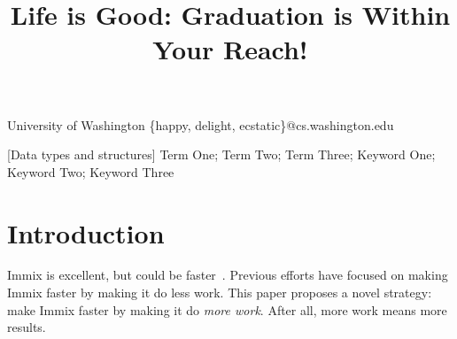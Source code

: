 \documentclass[10pt,natbib,preprint]{sigplanconf}
\begin{document}

\title{Life is Good: Graduation is Within Your Reach!}

           {University of Washington}
           {\{happy, delight, ecstatic\}@cs.washington.edu}

\maketitle



{\footnotesize
{}[Data
    types and structures]
\terms  %
Term One; Term Two; Term Three;
\keywords
Keyword One; Keyword Two; Keyword Three
}


\section{Introduction}

Immix is excellent, but could be faster~\citep{immix}. Previous efforts have
focused on making Immix faster by making it do less work. This paper proposes
a novel strategy: make Immix faster by making it do \emph{more work}. 
After all, more work means more results.



\end{document}
